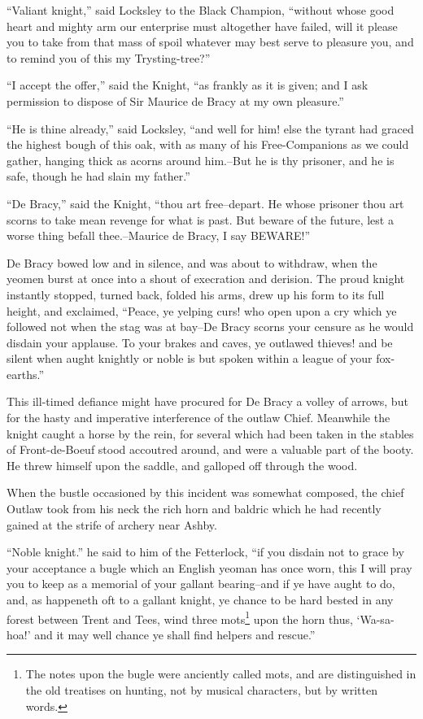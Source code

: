 ``Valiant knight,'' said Locksley to the Black Champion, ``without whose
good heart and mighty arm our enterprise must altogether have failed,
will it please you to take from that mass of spoil whatever may best
serve to pleasure you, and to remind you of this my Trysting-tree?''

``I accept the offer,'' said the Knight, ``as frankly as it is given;
and I ask permission to dispose of Sir Maurice de Bracy at my own
pleasure.''

``He is thine already,'' said Locksley, ``and well for him! else the
tyrant had graced the highest bough of this oak, with as many of his
Free-Companions as we could gather, hanging thick as acorns around
him.--But he is thy prisoner, and he is safe, though he had slain my
father.''

``De Bracy,'' said the Knight, ``thou art free--depart. He whose
prisoner thou art scorns to take mean revenge for what is past. But
beware of the future, lest a worse thing befall thee.--Maurice de Bracy,
I say BEWARE!''

De Bracy bowed low and in silence, and was about to withdraw, when the
yeomen burst at once into a shout of execration and derision. The proud
knight instantly stopped, turned back, folded his arms, drew up his form
to its full height, and exclaimed, ``Peace, ye yelping curs! who open
upon a cry which ye followed not when the stag was at bay--De Bracy
scorns your censure as he would disdain your applause. To your brakes
and caves, ye outlawed thieves! and be silent when aught knightly or
noble is but spoken within a league of your fox-earths.''

This ill-timed defiance might have procured for De Bracy a volley of
arrows, but for the hasty and imperative interference of the outlaw
Chief. Meanwhile the knight caught a horse by the rein, for several
which had been taken in the stables of Front-de-Boeuf stood accoutred
around, and were a valuable part of the booty. He threw himself upon the
saddle, and galloped off through the wood.

When the bustle occasioned by this incident was somewhat composed, the
chief Outlaw took from his neck the rich horn and baldric which he had
recently gained at the strife of archery near Ashby.

``Noble knight.'' he said to him of the Fetterlock, ``if you disdain not
to grace by your acceptance a bugle which an English yeoman has once
worn, this I will pray you to keep as a memorial of your gallant
bearing--and if ye have aught to do, and, as happeneth oft to a gallant
knight, ye chance to be hard bested in any forest between Trent and
Tees, wind three mots\footnote{The notes upon the bugle were anciently
called mots, and
are distinguished in the old treatises on hunting, not by musical
characters, but by written words.} upon the horn thus, `Wa-sa-hoa!' and it
may well chance ye shall find helpers and rescue.''

